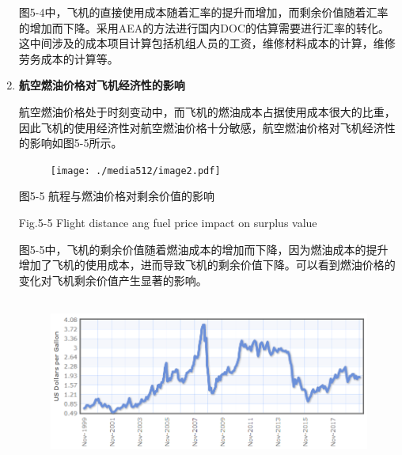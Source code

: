 \documentclass[12pt]{article}
\begin{document}
\begin{enumerate}
图5-4中，飞机的直接使用成本随着汇率的提升而增加，而剩余价值随着汇率的增加而下降。采用AEA的方法进行国内DOC的估算需要进行汇率的转化。这中间涉及的成本项目计算包括机组人员的工资，维修材料成本的计算，维修劳务成本的计算等。\par

	\item \textbf{航空燃油价格对飞机经济性的影响}\par

航空燃油价格处于时刻变动中，而飞机的燃油成本占据使用成本很大的比重，因此飞机的使用经济性对航空燃油价格十分敏感，航空燃油价格对飞机经济性的影响如图5-5所示。\par




\begin{figure}[H]
	\begin{Center}
		\texttt{[image: ./media512/image2.pdf]}
	\end{Center}
\end{figure}



\par

\begin{Center}
图5-5 航程与燃油价格对剩余价值的影响
\end{Center}\par

\begin{Center}
Fig.5-5 Flight distance ang fuel price impact on surplus value
\end{Center}\par


\vspace{\baselineskip}
图5-5中，飞机的剩余价值随着燃油成本的增加而下降，因为燃油成本的提升增加了飞机的使用成本，进而导致飞机的剩余价值下降。可以看到燃油价格的变化对飞机剩余价值产生显著的影响。\par




\begin{figure}[H]
	\begin{Center}
		\includegraphics[width=5.04in,height=2.15in]{./media512/image3.png}
	\end{Center}
\end{figure}



\end{enumerate}
\end{document}
